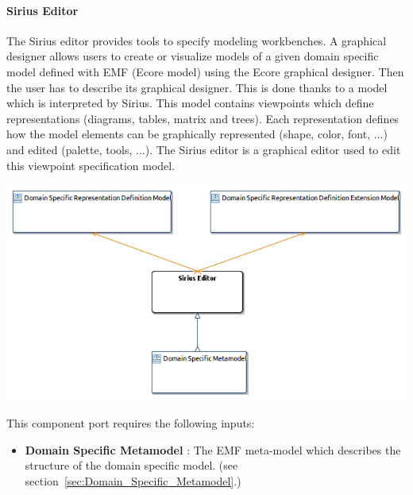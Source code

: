 \documentclass{gemoc} %
\begin{document}
\paragraph{Sirius Editor}
\label{sec:Sirius_Editor}
The Sirius editor provides tools to specify modeling workbenches. A graphical designer allows users to create or visualize models of a given domain specific model defined with EMF (Ecore model) using the Ecore graphical designer. Then the user has to describe its graphical designer. This is done thanks to a model which is interpreted by Sirius. This model contains viewpoints which define representations (diagrams, tables, matrix and trees). Each representation defines how the model elements can be graphically represented (shape, color, font, ...) and edited (palette, tools, ...).
The Sirius editor is a graphical editor used to edit this viewpoint specification model.
\begin{center}
\includegraphics*[trim=0.0cm 0.0cm 0cm 0.0cm, clip=true]{../images/generated/Generated_Sirius_Editor.png}
\end{center}

This component port requires the following inputs:
\begin{itemize}
  \item \textbf{Domain Specific Metamodel} :
The EMF meta-model which describes the structure of the domain specific model.
(see section~\ref{sec:Domain_Specific_Metamodel}.)
\end{itemize}
\end{document}
